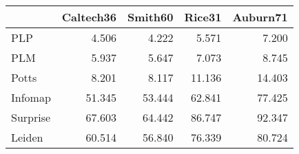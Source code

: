 \begin{tabular}{lrrrr}
\toprule
{} & Caltech36 & Smith60 & Rice31 & Auburn71 \\
\midrule
PLP      &     4.506 &   4.222 &  5.571 &    7.200 \\
PLM      &     5.937 &   5.647 &  7.073 &    8.745 \\
Potts    &     8.201 &   8.117 & 11.136 &   14.403 \\
Infomap  &    51.345 &  53.444 & 62.841 &   77.425 \\
Surprise &    67.603 &  64.442 & 86.747 &   92.347 \\
Leiden   &    60.514 &  56.840 & 76.339 &   80.724 \\
\bottomrule
\end{tabular}
